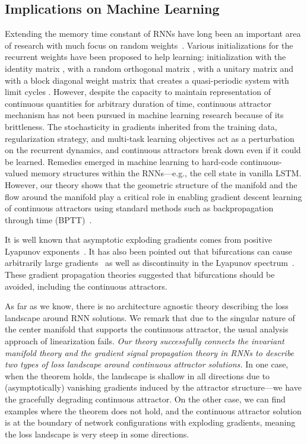 \documentclass{article}
\newcounter{ct}
\theoremstyle{definition}
\theoremstyle{remark}
\begin{document}
\subsection{Implications on Machine Learning}\label{sec:imp:ML}
Extending the memory time constant of RNNs have long been an important area of research with much focus on random weights~\cite{Legenstein2007,Goldman2009,Toyoizumi2011,Kerg2019,Chen2018,Henaff2016,Rusch2021,arjovsky2016}.
Various initializations for the recurrent weights have been proposed to help learning: initialization with the identity matrix \citep{le2015}, with a random orthogonal matrix \citep{saxe2014,Henaff2016}, with a unitary matrix \citep{arjovsky2016} and with a block diagonal weight matrix that creates a quasi-periodic system with limit cycles \citep{Sokol2019a}.
However, despite the capacity to maintain representation of continuous quantities for arbitrary duration of time, continuous attractor mechanism has not been pursued in machine learning research because of its brittleness.
The stochasticity in gradients inherited from the training data, regularization strategy, and multi-task learning objectives act as a perturbation on the recurrent dynamics, and continuous attractors break down even if it could be learned.
Remedies emerged in machine learning to hard-code continuous-valued memory structures within the RNNs---e.g., the cell state in vanilla LSTM.
However, our theory shows that the geometric structure of the manifold and the flow around the manifold play a critical role in enabling gradient descent learning of continuous attractors using standard methods such as backpropagation through time (BPTT)~\cite{Toomarian1991}.

It is well known that asymptotic exploding gradients comes from positive Lyapunov exponents~\cite{Mikhaeil2022,Vogt2022,Engelken2023}.
It has also been pointed out that bifurcations can cause arbitrarily large gradients~\cite{doya1993} as well as discontinuity in the Lyapunov spectrum~\cite{Park2023a}.
These gradient propagation theories suggested that bifurcations should be avoided, including the continuous attractors.

As far as we know, there is no architecture agnostic theory describing the loss landscape around RNN solutions.
We remark that due to the singular nature of the center manifold that supports the continuous attractor, the usual analysis approach of linearization fails.
\emph{Our theory successfully connects the invariant manifold theory and the gradient signal propagation theory in RNNs to describe two types of loss landscape around continuous attractor solutions.}
In one case, when the theorem holds, the landscape is shallow in all directions due to (asymptotically) vanishing gradients induced by the attractor structure---we have the gracefully degrading continuous attractor.
On the other case, we can find examples where the theorem does not hold, and the continuous attractor solution is at the boundary of network configurations with exploding gradients, meaning the loss landscape is very steep in some directions.
\end{document}
